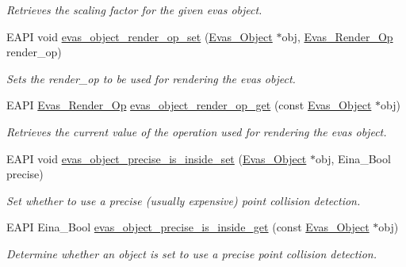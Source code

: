 \begin{DoxyCompactItemize}
\begin{DoxyCompactList}\small\item\em Retrieves the scaling factor for the given evas object. \item\end{DoxyCompactList}\item 
EAPI void \hyperlink{group__Evas__Object__Group__Extras_ga86ef8d1f039bff1a60595688f93a7990}{evas\_\-object\_\-render\_\-op\_\-set} (\hyperlink{group__Evas__Object__Group_ga9e19e6dd1f517a0ba437c0114d3e7c97}{Evas\_\-Object} $\ast$obj, \hyperlink{group__Evas__Object__Group__Extras_ga9c39a3ca795bbec3687fae9ee67d6056}{Evas\_\-Render\_\-Op} render\_\-op)
\begin{DoxyCompactList}\small\item\em Sets the render\_\-op to be used for rendering the evas object. \item\end{DoxyCompactList}\item 
EAPI \hyperlink{group__Evas__Object__Group__Extras_ga9c39a3ca795bbec3687fae9ee67d6056}{Evas\_\-Render\_\-Op} \hyperlink{group__Evas__Object__Group__Extras_gaa157afa6f23cdf4b344d95531bb7d508}{evas\_\-object\_\-render\_\-op\_\-get} (const \hyperlink{group__Evas__Object__Group_ga9e19e6dd1f517a0ba437c0114d3e7c97}{Evas\_\-Object} $\ast$obj)
\begin{DoxyCompactList}\small\item\em Retrieves the current value of the operation used for rendering the evas object. \item\end{DoxyCompactList}\item 
EAPI void \hyperlink{group__Evas__Object__Group__Extras_gac9ce9802afd7d4cba580fbcbe92c28b2}{evas\_\-object\_\-precise\_\-is\_\-inside\_\-set} (\hyperlink{group__Evas__Object__Group_ga9e19e6dd1f517a0ba437c0114d3e7c97}{Evas\_\-Object} $\ast$obj, Eina\_\-Bool precise)
\begin{DoxyCompactList}\small\item\em Set whether to use a precise (usually expensive) point collision detection. \item\end{DoxyCompactList}\item 
EAPI Eina\_\-Bool \hyperlink{group__Evas__Object__Group__Extras_ga8483a3c855f466a5dca480fcfd07b52b}{evas\_\-object\_\-precise\_\-is\_\-inside\_\-get} (const \hyperlink{group__Evas__Object__Group_ga9e19e6dd1f517a0ba437c0114d3e7c97}{Evas\_\-Object} $\ast$obj)
\begin{DoxyCompactList}\small\item\em Determine whether an object is set to use a precise point collision detection. \item\end{DoxyCompactList}\item 

\end{DoxyCompactItemize}
